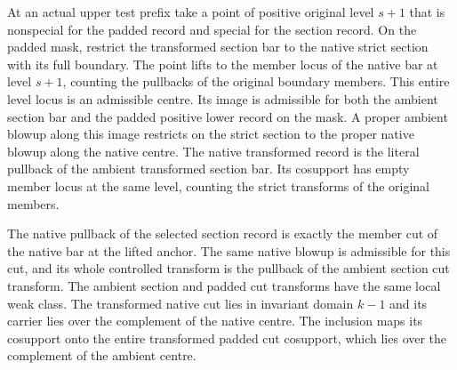 \begin{theorem}
\label{hir:g1-positive-normal-native-special-step}
\leanok
At an actual upper test prefix take a point of positive original level $s+1$ that is
nonspecial for the padded record and special for the section record.
On the padded mask, restrict the transformed section bar to the native
strict section with its full boundary. The point lifts to the member
locus of the native bar at level $s+1$, counting the pullbacks of the
original boundary members. This entire level locus is an admissible
centre. Its image is admissible for both the ambient section bar and the
padded positive lower record on the mask. A proper ambient blowup
along this image restricts on the strict section to the proper native
blowup along the native centre. The native transformed record is the
literal pullback of the ambient transformed section bar. Its cosupport
has empty member locus at the same level, counting the strict transforms
of the original members.

The native pullback of the selected section record is exactly the
member cut of the native bar at the lifted anchor. The same native
blowup is admissible for this cut, and its whole controlled transform
is the pullback of the ambient section cut transform. The ambient
section and padded cut transforms have the same local weak class.
The transformed native cut lies in invariant domain $k-1$ and its
carrier lies over the complement of the native centre.
The inclusion maps its cosupport onto the entire transformed padded
cut cosupport, which lies over the complement of the ambient centre.
\end{theorem}
